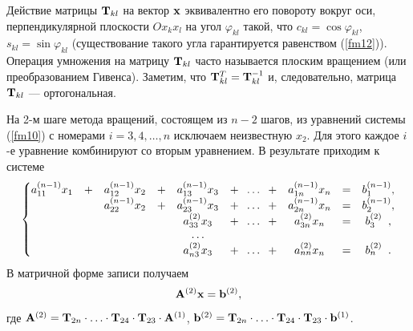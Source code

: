 \documentclass[12pt]{article}
\begin{document}
	Действие матрицы $\bold{T}_{kl}$ на вектор $\bold{x}$ эквивалентно его повороту вокруг оси, перпендикулярной плоскости $Ox_kx_l$ на угол $\varphi_{kl}$ такой, что $c_{kl}=\cos\varphi_{kl}$, $s_{kl}=\sin \varphi_{kl}$ (существование такого угла гарантируется равенством (\ref{fm12})). Операция умножения на матрицу $\bold{T}_{kl}$ часто называется плоским вращением (или преобразованием Гивенса). Заметим, что $\bold{T}_{kl}^{T}=\bold{T}_{kl}^{-1}$ и, следовательно, матрица $\bold{T}_{kl}$ --- ортогональная.
	
	На 2-м шаге метода вращений, состоящем из $n-2$ шагов, из уравнений системы (\ref{fm10}) с номерами $i=3,4,\ldots,n$ исключаем неизвестную $x_2$. Для этого каждое $i$-е уравнение комбинируют со вторым уравнением. В результате приходим к системе
	\begin{equation}
		\begin{gathered}
			\left\{
			\begin{matrix}
				a_{11}^{\left(n-1\right)}x_1 &+ &a_{12}^{\left(n-1\right)}x_2 &+ &a_{13}^{\left(n-1\right)}x_3&+\hspace{2mm}\ldots\hspace{2mm}+&a_{1n}^{\left(n-1\right)}x_n & = &b_{1}^{\left(n-1\right)},\\
				&&a_{22}^{\left(n-1\right)}x_2&+&a_{23}^{\left(n-1\right)}x_3&+\hspace{2mm}\ldots\hspace{2mm}+&a_{2n}^{\left(n-1\right)}x_n&=&b_{2}^{\left(n-1\right)},\\
				&  &  &  & a_{33}^{\left(2\right)}x_3 & +\hspace{2mm}\ldots \hspace{2mm}+ &a_{3n}^{\left(2\right)}x_n&=&b_{3}^{\left(2\right)}\hspace{1.9mm},\\
				&&&&\ldots\\
				&  &  &  & a_{n3}^{\left(2\right)}x_3 & +\hspace{2mm}\ldots \hspace{2mm}+ &a_{nn}^{\left(2\right)}x_n&=&b_{n}^{\left(2\right)}\hspace{1.9mm}.
			\end{matrix}
			\right.
		\end{gathered}\label{fm13}
	\end{equation}
	В матричной форме записи получаем
	\begin{equation}
		\bold{A}^{\left(2\right)}\bold{x}=\bold{b}^{\left(2\right)},
	\end{equation}
	где $\bold{A}^{\left(2\right)}=\bold{T}_{2n}\cdot \ldots \cdot \bold{T}_{24}\cdot\bold{T}_{23}\cdot\bold{A}^{\left(1\right)}$, $\bold{b}^{\left(2\right)}=\bold{T}_{2n}\cdot\ldots\cdot\bold{T}_{24}\cdot\bold{T}_{23}\cdot \bold{b}^{\left(1\right)}$.
	
\end{document}

